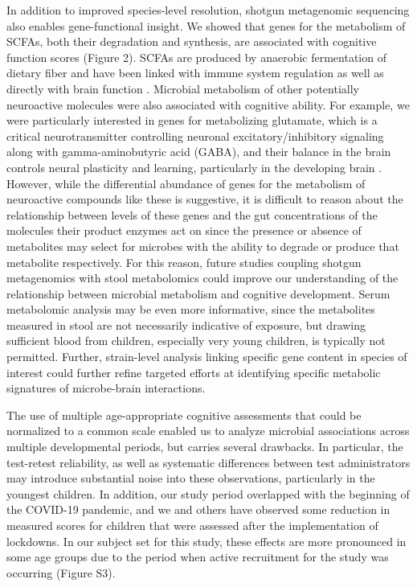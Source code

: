 \documentclass{article}
\begin{document}
In addition to improved species-level resolution, shotgun metagenomic
sequencing also enables gene-functional insight. We showed that
genes for the metabolism of SCFAs, both their degradation and synthesis,
are associated with cognitive function scores (Figure 2). 
SCFAs are produced by anaerobic fermentation of dietary fiber
and have been linked with immune system regulation as well as directly
with brain function \cite{dalileRoleShortchainFatty2019}.
Microbial metabolism of other potentially neuroactive molecules
were also associated with cognitive ability. For example, we were
particularly interested in genes for metabolizing glutamate, which is a
critical neurotransmitter controlling neuronal excitatory/inhibitory
signaling along with gamma-aminobutyric acid (GABA), and their balance
in the brain controls neural plasticity and learning, particularly in
the developing brain \cite{cohenkadoshLinkingGABAGlutamate2015,palomo-buitragoGlutamateInteractionsObesity2019}.
However, while the
differential abundance of genes for the metabolism of neuroactive
compounds like these is suggestive, it is difficult to reason about the
relationship between levels of these genes and the gut concentrations of
the molecules their product enzymes act on since the presence or absence
of metabolites may select for microbes with the ability to degrade
or produce that metabolite respectively.
For this reason, future studies coupling shotgun
metagenomics with stool metabolomics could improve our understanding of
the relationship between microbial metabolism and cognitive development.
Serum metabolomic analysis may be even more informative,
since the metabolites measured in stool are not necessarily indicative
of exposure, but drawing sufficient blood from children,
especially very young children, is typically not permitted.
Further, strain-level analysis linking specific gene content in species
of interest could further refine targeted efforts at identifying
specific metabolic signatures of microbe-brain interactions.

The use of multiple age-appropriate cognitive assessments that could be
normalized to a common scale enabled us to analyze microbial
associations across multiple developmental periods, but carries several
drawbacks. In particular, the test-retest reliability, as well as
systematic differences between test administrators may introduce
substantial noise into these observations, particularly in the youngest
children. In addition, our study period overlapped with the beginning of
the COVID-19 pandemic, and we and others have observed some reduction in
measured scores for children that were assessed after the implementation
of lockdowns. In our subject set for this study, these effects are more
pronounced in some age groups due to the period when active recruitment for
the study was occurring
\cite{blackwellYouthWellbeingCOVID192022,deoniImpactCOVID19Pandemic2021}
(Figure S3).
\end{document}
